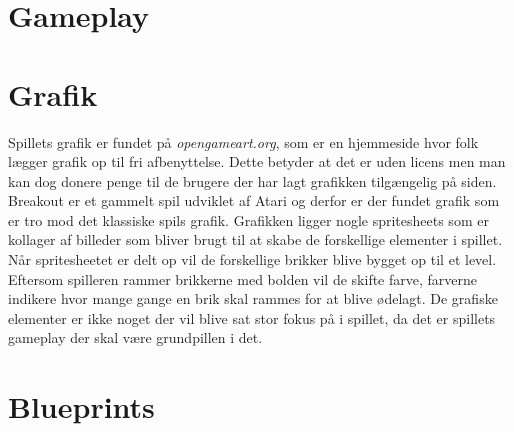 
\section{Gameplay}

\section{Grafik}

Spillets grafik er fundet på \textit{opengameart.org}, som er en hjemmeside hvor folk lægger grafik op til fri afbenyttelse. Dette betyder at det er uden licens men man kan dog donere penge til de brugere der har lagt grafikken tilgængelig på siden. \newline
Breakout er et gammelt spil udviklet af Atari og derfor er der fundet grafik som er tro mod det klassiske spils grafik. Grafikken ligger nogle spritesheets som er kollager af billeder som bliver brugt til at skabe de forskellige elementer i spillet. Når spritesheetet er delt op vil de forskellige brikker blive bygget op til et level. Eftersom spilleren rammer brikkerne med bolden vil de skifte farve, farverne indikere hvor mange gange en brik skal rammes for at blive ødelagt. De grafiske elementer er ikke noget der vil blive sat stor fokus på i spillet, da det er spillets gameplay der skal være grundpillen i det. 
\section{Blueprints}